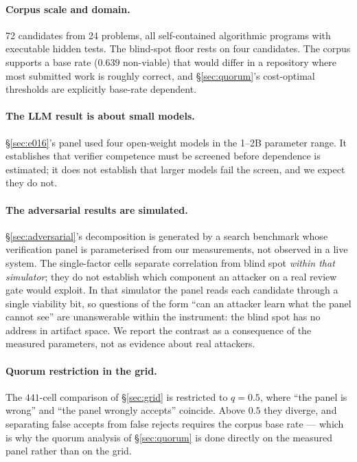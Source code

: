 \documentclass[11pt,a4paper]{article}
\begin{document}
\paragraph{Corpus scale and domain.} 72 candidates from 24 problems, all
self-contained algorithmic programs with executable hidden tests. The blind-spot
floor rests on four candidates. The corpus supports a base rate ($0.639$
non-viable) that would differ in a repository where most submitted work is
roughly correct, and \S\ref{sec:quorum}'s cost-optimal thresholds are explicitly
base-rate dependent.

\paragraph{The LLM result is about small models.} \S\ref{sec:e016}'s panel used
four open-weight models in the 1--2B parameter range. It establishes that
verifier competence must be screened before dependence is estimated; it does not
establish that larger models fail the screen, and we expect they do not.

\paragraph{The adversarial results are simulated.}
\S\ref{sec:adversarial}'s decomposition is generated by a search benchmark whose
verification panel is parameterised from our measurements, not observed in a live
system. The single-factor cells separate correlation from blind spot
\emph{within that simulator}; they do not establish which component an attacker
on a real review gate would exploit. In that
simulator the panel reads each candidate through a single viability bit, so
questions of the form ``can an attacker learn what the panel cannot see'' are
unanswerable within the instrument: the blind spot has no address in artifact
space. We report the contrast as a consequence of the measured parameters, not as
evidence about real attackers.

\paragraph{Quorum restriction in the grid.} The $441$-cell comparison of
\S\ref{sec:grid} is restricted to $q = 0.5$, where ``the panel is wrong'' and
``the panel wrongly accepts'' coincide. Above $0.5$ they diverge, and separating
false accepts from false rejects requires the corpus base rate --- which is why
the quorum analysis of \S\ref{sec:quorum} is done directly on the measured panel
rather than on the grid.
\end{document}
